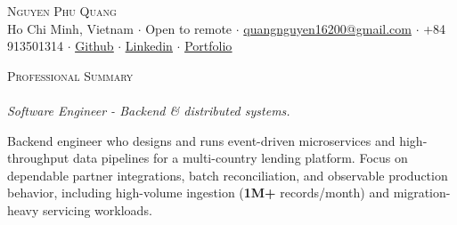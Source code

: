 \documentclass[a4paper]{article}
\newcommand{\lineunder} {
 \vspace*{-8pt} \\
 \hspace*{-18pt} \hrulefill \\
}
\newcommand{\header} [1] {
 {\hspace*{-18pt}\vspace*{6pt} \textsc{#1}}
 \vspace*{-6pt} \lineunder
}
\begin{document}
\vspace*{-40pt}

\vspace*{-9pt}
\begin{center}
      {\Huge \scshape {Nguyen Phu Quang}}\\
      \vspace{1mm}
      Ho Chi Minh, Vietnam $\cdot$ Open to remote $\cdot$ \underline{quangnguyen16200@gmail.com} $\cdot$ +84 913501314 $\cdot$ \href{https://github.com/McPepperoni}{\underline{Github}} $\cdot$ \href{https://www.linkedin.com/in/quang-phu-nguyen}{\underline{Linkedin}} $\cdot$
      \href{https://mcpepperoni.vercel.app/}{\underline{Portfolio}} \\
\end{center}
\vspace{-2mm}
\header{Professional Summary}
\vspace{0.5mm}
\textit{Software Engineer - Backend \& distributed systems.}\par\vspace{1.5mm}

Backend engineer who designs and runs event-driven microservices and high-throughput data pipelines for a multi-country lending platform. Focus on dependable partner integrations, batch reconciliation, and observable production behavior, including high-volume ingestion (\textbf{1M+} records/month) and migration-heavy servicing workloads.\par
\vspace{-0.5mm}
\end{document}
